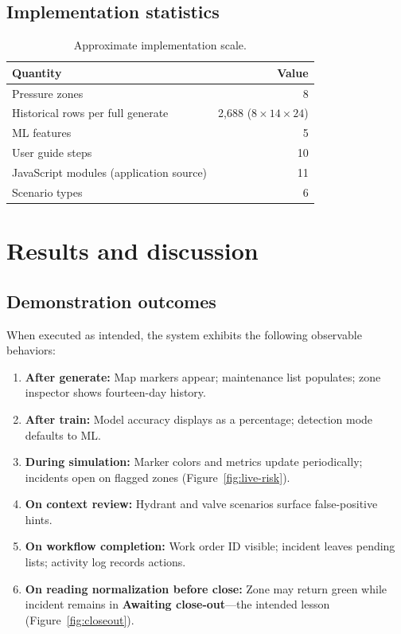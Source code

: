\documentclass[12pt,a4paper]{article}
\begin{document}
\subsection{Implementation statistics}

\begin{table}[htbp]
\centering
\caption{Approximate implementation scale.}
\label{tab:stats}
\begin{tabular}{@{}lr@{}}
\toprule
\textbf{Quantity} & \textbf{Value} \\
\midrule
Pressure zones & 8 \\
Historical rows per full generate & 2{,}688 ($8 \times 14 \times 24$) \\
ML features & 5 \\
User guide steps & 10 \\
JavaScript modules (application source) & 11 \\
Scenario types & 6 \\
\bottomrule
\end{tabular}
\end{table}

\section{Results and discussion}
\label{sec:results}

\subsection{Demonstration outcomes}

When executed as intended, the system exhibits the following observable behaviors:
\begin{enumerate}
    \item \textbf{After generate:} Map markers appear; maintenance list populates; zone inspector shows fourteen-day history.
    \item \textbf{After train:} Model accuracy displays as a percentage; detection mode defaults to ML.
    \item \textbf{During simulation:} Marker colors and metrics update periodically; incidents open on flagged zones (Figure~\ref{fig:live-risk}).
    \item \textbf{On context review:} Hydrant and valve scenarios surface false-positive hints.
    \item \textbf{On workflow completion:} Work order ID visible; incident leaves pending lists; activity log records actions.
    \item \textbf{On reading normalization before close:} Zone may return green while incident remains in \textbf{Awaiting close-out}---the intended lesson (Figure~\ref{fig:closeout}).
\end{enumerate}
\end{document}
